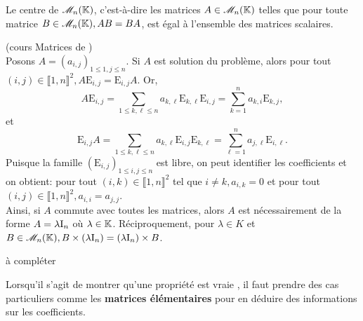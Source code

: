 \begin{prop}
Le centre de $\mathscr{M}_n(\mathbb{K})$, c'est-à-dire les matrices $A \in \mathscr{M}_n(\mathbb{K})$ telles que pour toute matrice $B \in \mathscr{M}_n(\mathbb{K}), AB = BA$, est égal à l'ensemble des matrices scalaires.
\end{prop}


\begin{preuve}
    (cours Matrices de \cite{maths-france})\\
    Posons $A = (a_{i,j})_{1 \leqslant 1, j \leqslant n}$. Si $A$ est solution du problème, alors pour tout $(i, j) \in \llbracket 1, n \rrbracket^2, A \mathrm{E}_{i,j} = \mathrm{E}_{i,j} A$. Or,
    $$A \mathrm{E}_{i,j} = \sum_{1 \leqslant k, \ell \leqslant n} a_{k, \ell} \mathrm{E}_{k,\ell} \mathrm{E}_{i,j} = \sum_{k=1}^{n} a_{k,i} \mathrm{E}_{k,j},$$
    et
    $$\mathrm{E}_{i,j} A = \sum_{1 \leqslant k, \ell \leqslant n} a_{k, \ell} \mathrm{E}_{i,j} \mathrm{E}_{k,\ell} = \sum_{\ell=1}^{n} a_{j,\ell} \mathrm{E}_{i,\ell}.$$
    Puisque la famille $(\mathrm{E}_{i, j})_{1 \leqslant i, j \leqslant n}$ est libre, on peut identifier les coefficients et on obtient: pour tout $(i, k) \in \llbracket 1, n \rrbracket^2$ tel que $i \not= k, a_{i,k}=0$ et pour tout $(i,j) \in \llbracket 1, n \rrbracket^2, a_{i,i}=a_{j,j}$. \\
    Ainsi, si $A$ commute avec toutes les matrices, alors $A$ est nécessairement de la forme $A = \lambda \mathrm{I}_n$ où $\lambda \in \mathbb{K}$. Réciproquement, pour $\lambda \in K$ et $B \in \mathscr{M}_n(\mathbb{K}), B \times (\lambda \mathrm{I}_n) = (\lambda \mathrm{I}_n) \times B$.
\end{preuve}

\begin{marginfigure}
à compléter
\end{marginfigure}

\begin{methode}
    Lorsqu'il s'agit de montrer qu'une propriété est vraie , il faut prendre des cas particuliers comme les \textbf{matrices élémentaires} pour en déduire des informations sur les coefficients.
\end{methode}
